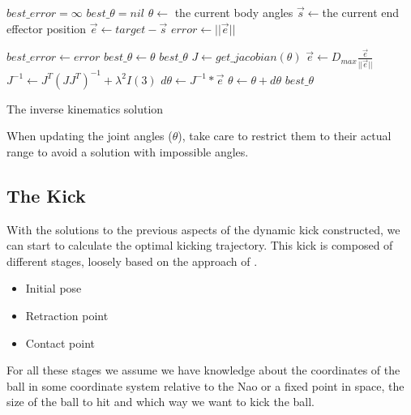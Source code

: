 \documentclass[a4paper]{article}
\begin{document}
\begin{algorithm}
  \begin{algorithmic}
      \State $best\_error = \infty$
      \State $best\_\theta = nil$
      \State $\theta \gets$ the current body angles
        \State $\vec{s} \gets $the current end effector position
        \State $\vec{e} \gets target - \vec{s}$
        \State $error \gets ||\vec{e}||$

          \State $best\_error \gets error$
          \State $best\_\theta \gets \theta$
        \EndIf
          \State \Return $best\_\theta$
        \Else
          \State $J \gets get\_jacobian(\theta)$
            \State $\vec{e} \gets D_{max} \frac{\vec{e}}{||\vec{e}||}$
          \EndIf
          \State $J^{-1} \gets J^T (J J^T)^{-1} + \lambda^2 I(3)$
          \State $d\theta \gets J^{-1} * \vec{e}$
          \State $\theta \gets \theta + d\theta$
        \EndIf
      \EndWhile
      \State \Return $best\_\theta$
    \EndFunction
  \end{algorithmic}
  \caption{The inverse kinematics solution}
  \label{code:ik}
\end{algorithm}

When updating the joint angles ($\theta$), take care to restrict them to their
actual range to avoid a solution with impossible angles.

\subsection{The Kick}
\label{sec:kick}
With the solutions to the previous aspects of the dynamic kick constructed, 
we can start to calculate the optimal kicking trajectory. This kick is composed
of different stages, loosely based on the approach of \cite{Xu2010}. 
\begin{itemize}
    \item Initial pose
    \item Retraction point
    \item Contact point
\end{itemize}

For all these stages we assume we have knowledge about the coordinates of the
ball in some coordinate system relative to the Nao or a fixed point in space,
the size of the ball to hit and which way we want to kick the ball.
\end{document}
